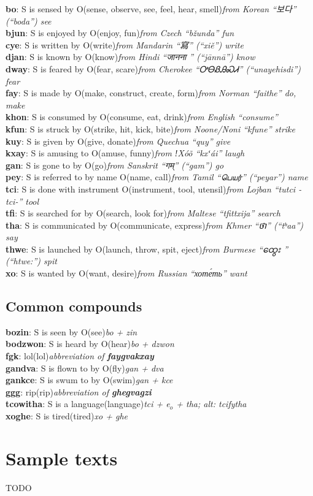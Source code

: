 \documentclass{article}
\newcommand{\dfn}[4]{\noindent\textbf{#1}: #2\quad(#3)\hfill\emph{#4}\\}
\begin{document}
\dfn{bo}{S is sensed by O}{sense, observe, see, feel, hear, smell}{from Korean ``보다'' (``boda'') see}
\dfn{bjun}{S is enjoyed by O}{enjoy, fun}{from Czech ``bžunda'' fun}
\dfn{cye}{S is written by O}{write}{from Mandarin ``寫'' (``xiě'') write}
\dfn{djan}{S is known by O}{know}{from Hindi ``{\devanagarifont जानना }'' (``jānnā'') know}
\dfn{dway}{S is feared by O}{fear, scare}{from Cherokee ``{\cherokeefont ᎤᎾᏰᎯᏍᏗ}'' (``unayehisdi'') fear}
\dfn{fay}{S is made by O}{make, construct, create, form}{from Norman ``faithe'' do, make}
\dfn{khon}{S is consumed by O}{consume, eat, drink}{from English ``consume''}
\dfn{kfun}{S is struck by O}{strike, hit, kick, bite}{from Noone/Noni ``kfune'' strike}
\dfn{kuy}{S is given by O}{give, donate}{from Quechua ``quy'' give}
\dfn{kxay}{S is amusing to O}{amuse, funny}{from ǃXóõ ``kxʻái'' laugh}
\dfn{gan}{S is gone to by O}{go}{from Sanskrit ``{\devanagarifont गम्}'' (``gam'') go}
\dfn{pey}{S is referred to by name O}{name, call}{from Tamil ``{\tamilfont பெயர்}'' (``peyar'') name}
\dfn{tci}{S is done with instrument O}{instrument, tool, utensil}{from Lojban ``tutci -tci-'' tool}
\dfn{tfi}{S is searched for by O}{search, look for}{from Maltese ``tfittxija'' search}
\dfn{tha}{S is communicated by O}{communicate, express}{from Khmer ``{\khmerfont ថា}''  (``tʰaa'') say}
\dfn{thwe}{S is launched by O}{launch, throw, spit, eject}{from Burmese ``{\myanmarfont ထွေး }'' (``htwe:'') spit}
\dfn{xo}{S is wanted by O}{want, desire}{from Russian ``хоте́ть'' want}

\subsection{Common compounds}

\dfn{bozin}{S is seen by O}{see}{bo + zin}
\dfn{bodzwon}{S is heard by O}{hear}{bo + dzwon}
\dfn{fgk}{lol}{lol}{abbreviation of \textbf{faygvakxay}}
\dfn{gandva}{S is flown to by O}{fly}{gan + dva}
\dfn{gankce}{S is swum to by O}{swim}{gan + kce}
\dfn{ggg}{rip}{rip}{abbreviation of \textbf{ghegvagzi}}
\dfn{tcowitha}{S is a language}{language}{tci + e$_o$ + tha; alt: tcifytha}
\dfn{xoghe}{S is tired}{tired}{xo + ghe}

\section{Sample texts}

TODO
\end{document}
